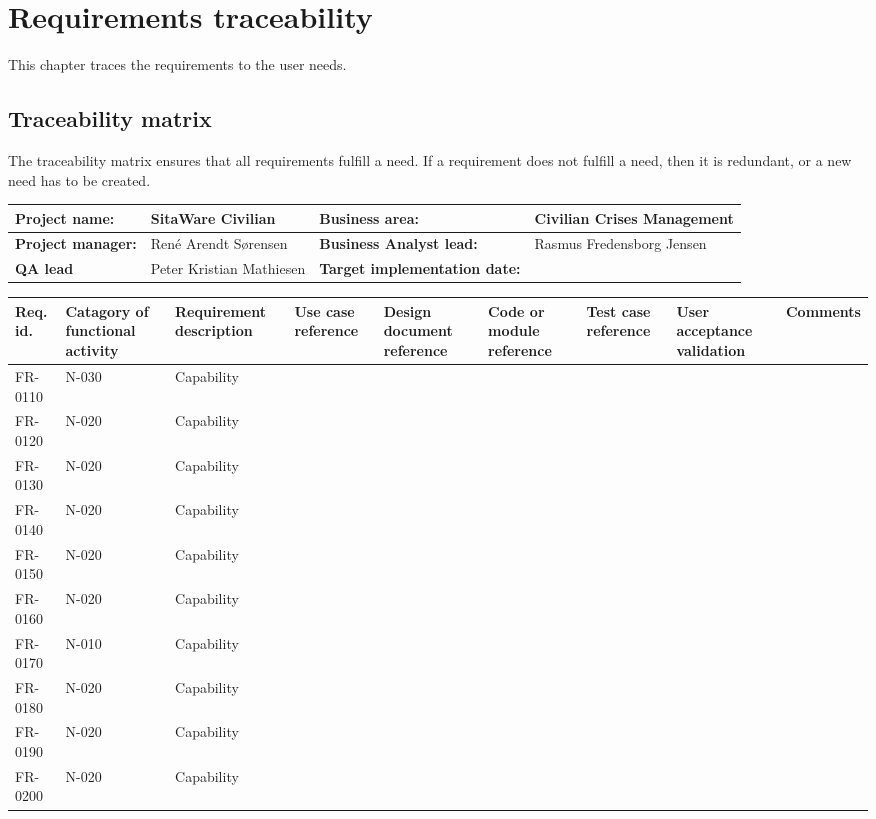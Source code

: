\chapter{Requirements traceability}
This chapter traces the requirements to the user needs.

\section{Traceability matrix}
The traceability matrix ensures that all requirements fulfill a need. If a requirement does not fulfill a need, then it is redundant, or a new need has to be created.


\begin{sidewaystable}
\begin{table}[H]
\begin{tabular}{|l|l|l|l|}
\hline
 \textbf{Project name:} & SitaWare Civilian & \textbf{Business area:}  & Civilian Crises Management\\ \hline
 \textbf{Project manager:} & René Arendt Sørensen & \textbf{Business Analyst lead:} & Rasmus Fredensborg  Jensen\\ \hline
 \textbf{QA lead} & Peter Kristian Mathiesen & \textbf{Target implementation date:}  & \\ \hline
\end{tabular}	
\begin{tabular}{|p{2cm}|p{2cm}|p{3cm}|p{2cm}|p{2cm}|p{2cm}|p{2cm}|p{2cm}|p{2cm}|}
\hline
 Req. id. & Catagory of functional activity & Requirement description  & Use case reference & Design document reference & Code or module reference & Test case reference & User acceptance validation & Comments\\ \hline
 FR-0110 & N-030 & Capability & & & & & &\\ \hline
 FR-0120 & N-020 & Capability & & & & & &\\ \hline
 FR-0130 & N-020 & Capability & & & & & &\\ \hline
 FR-0140 & N-020 & Capability & & & & & &\\ \hline
 FR-0150 & N-020 & Capability & & & & & &\\ \hline
 FR-0160 & N-020 & Capability & & & & & &\\ \hline
 FR-0170 & N-010 & Capability & & & & & &\\ \hline
 FR-0180 & N-020 & Capability & & & & & &\\ \hline
 FR-0190 & N-020 & Capability & & & & & &\\ \hline
 FR-0200 & N-020 & Capability & & & & & &\\ \hline

\end{tabular}
\end{table}
\end{sidewaystable}
